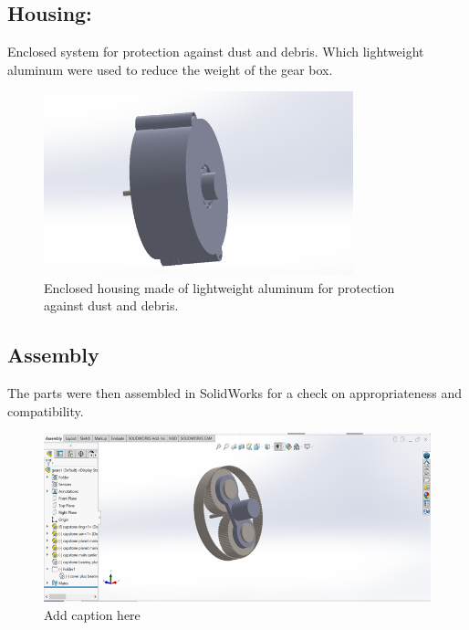 \documentclass[../../main]{subfiles}
\begin{document}
\subsection{Housing:} 
Enclosed system for protection against dust and debris.
Which lightweight aluminum were used to reduce the weight of the gear
box.
\begin{figure}[h]
  \centering
  \includegraphics[width=0.8\textwidth]{sublatex/Opryrmi/media/image5.png} 
  \caption{Enclosed housing made of lightweight aluminum for protection against dust and debris.}
\end{figure}

\newpage
\subsection{Assembly}

The parts were then assembled in SolidWorks for a check on
appropriateness and \\ compatibility.
\begin{figure}[h]
  \centering
\includegraphics[]{sublatex/Opryrmi/media/image6.png}
\caption{Add caption here}
\end{figure}
\end{document}
